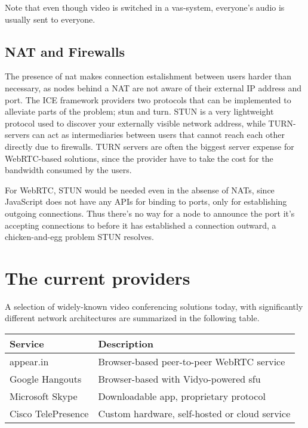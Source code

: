 Note that even though video is switched in a \gls{vas}-system, everyone's audio is usually sent to everyone.

\subsection{NAT and Firewalls}

The presence of \gls{nat} makes connection estalishment between users harder than necessary, as nodes behind a NAT are not aware of their external IP address and port. The \gls{ICE} framework providers two protocols that can be implemented to alleviate parts of the problem; \gls{stun} and \gls{turn}. STUN is a very lightweight protocol used to discover your externally visible network address, while TURN-servers can act as intermediaries between users that cannot reach each other directly due to firewalls. TURN servers are often the biggest server expense for WebRTC-based solutions, since the provider have to take the cost for the bandwidth consumed by the users.

For WebRTC, STUN would be needed even in the absense of NATs, since JavaScript does not have any APIs for binding to ports, only for establishing outgoing connections. Thus there's no way for a node to announce the port it's accepting connections to before it has established a connection outward, a chicken-and-egg problem STUN resolves.


\section{The current providers}

A selection of widely-known video conferencing solutions today, with significantly different network architectures are summarized in the following table.

\begin{center}
	\label{tab:existing-solutions}
	\begin{tabular}{| l | l |}
		\hline
		\textbf{Service} & \textbf{Description} \\ \hline
		appear.in & Browser-based peer-to-peer WebRTC service \\ \hline
		Google Hangouts & Browser-based with Vidyo-powered \gls{sfu} \\ \hline
		Microsoft Skype & Downloadable app, proprietary protocol \\ \hline
		Cisco TelePresence & Custom hardware, self-hosted or cloud service \\ \hline
	\end{tabular}
\end{center}

